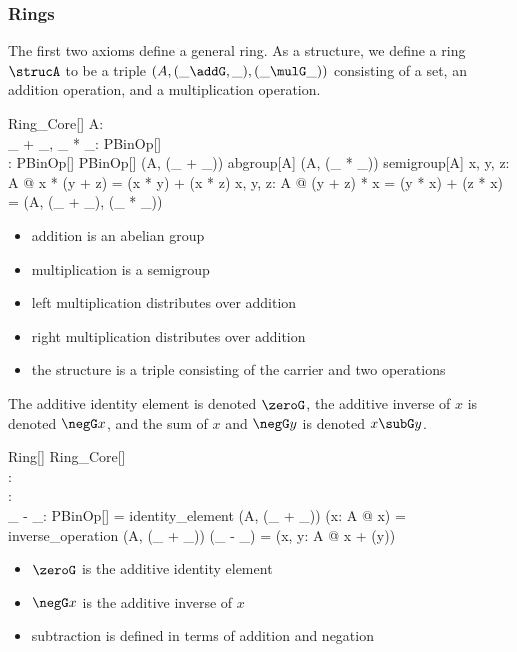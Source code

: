 \documentclass{amsart}
\begin{document}
\subsubsection{Rings}

The first two axioms define a general ring.
As a structure, we define a ring $\strucA$ to be a triple $(A, (\_ \addG, \_), (\_ \mulG \_))$ 
consisting of a set, an addition operation, and a multiplication operation.

\begin{schema}{Ring\_Core}[\genT]
	A: \power \genT \\
	\_ + \_, \_ * \_: PBinOp[\genT] \\
	\strucA: \power \genT \cross PBinOp[\genT] \cross PBinOp[\genT]
\where
	(A, (\_ + \_)) \in abgroup[A]
\also
	(A, (\_ * \_)) \in semigroup[A]
\also
	\forall x, y, z: A @ x * (y + z) = (x * y) + (x * z)
\also
	\forall x, y, z: A @ (y + z) * x  = (y * x) + (z * x)
\also
	\strucA = (A, (\_ + \_), (\_ * \_))
\end{schema}

\begin{itemize}
	\item addition is an abelian group
	\item multiplication is a semigroup
	\item left multiplication distributes over addition
	\item right multiplication distributes over addition
	\item the structure is a triple consisting of the carrier and two operations
\end{itemize}

The additive identity element is denoted $\zeroG$, 
the additive inverse of $x$ is denoted $\negG x$, and
the sum of $x$ and $\negG y$ is denoted $x \subG y$.

\begin{schema}{Ring}[\genT]
	Ring\_Core[\genT] \\
	\zeroG: \genT \\
	\negG: \genT \pfun \genT \\
	\_ - \_: PBinOp[\genT]
\where
	\zeroG = identity\_element (A, (\_ + \_))
\also
	(\lambda x: A @ \negG x) = inverse\_operation (A, (\_ + \_))
\also
	(\_ - \_) = (\lambda x, y: A @ x + (\negG y))
\end{schema}

\begin{itemize}
	\item $\zeroG$ is the additive identity element
	\item $\negG x$ is the additive inverse of $x$
	\item subtraction is defined in terms of addition and negation
\end{itemize}
\end{document}
